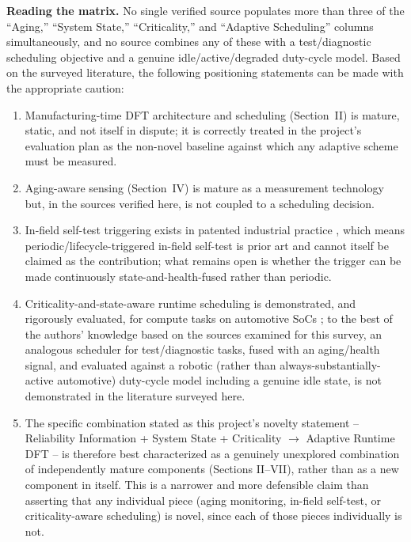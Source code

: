 \documentclass[journal]{IEEEtran}
\begin{document}
\textbf{Reading the matrix.} No single verified source populates more than three of the ``Aging,'' ``System State,'' ``Criticality,'' and ``Adaptive Scheduling'' columns simultaneously, and no source combines any of these with a test/diagnostic scheduling objective and a genuine idle/active/degraded duty-cycle model. Based on the surveyed literature, the following positioning statements can be made with the appropriate caution:
\begin{enumerate}
\item Manufacturing-time DFT architecture and scheduling (Section~II) is mature, static, and not itself in dispute; it is correctly treated in the project's evaluation plan as the non-novel baseline against which any adaptive scheme must be measured.
\item Aging-aware sensing (Section~IV) is mature as a measurement technology but, in the sources verified here, is not coupled to a scheduling decision.
\item In-field self-test triggering exists in patented industrial practice \cite{r9}, which means periodic/lifecycle-triggered in-field self-test is prior art and cannot itself be claimed as the contribution; what remains open is whether the trigger can be made continuously state-and-health-fused rather than periodic.
\item Criticality-and-state-aware runtime scheduling is demonstrated, and rigorously evaluated, for compute tasks on automotive SoCs \cite{r18}; to the best of the authors' knowledge based on the sources examined for this survey, an analogous scheduler for test/diagnostic tasks, fused with an aging/health signal, and evaluated against a robotic (rather than always-substantially-active automotive) duty-cycle model including a genuine idle state, is not demonstrated in the literature surveyed here.
\item The specific combination stated as this project's novelty statement -- Reliability Information + System State + Criticality $\rightarrow$ Adaptive Runtime DFT -- is therefore best characterized as a genuinely unexplored combination of independently mature components (Sections II--VII), rather than as a new component in itself. This is a narrower and more defensible claim than asserting that any individual piece (aging monitoring, in-field self-test, or criticality-aware scheduling) is novel, since each of those pieces individually is not.
\end{enumerate}
\end{document}
